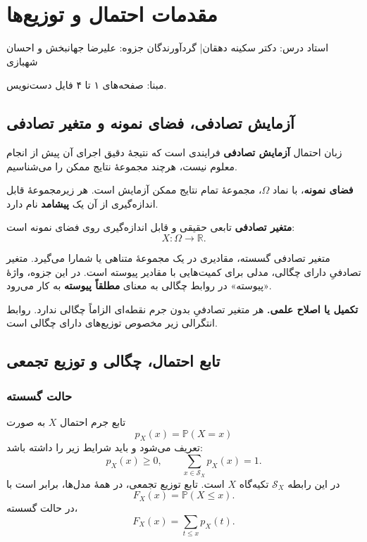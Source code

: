 \documentclass[12pt,a4paper,oneside]{report}
\newcounter{ex}[chapter]
\newcommand{\edit}[1]{\par\begingroup\small\color{alert}\textbf{تکمیل یا اصلاح علمی.} #1\par\endgroup}
\newcommand{\source}[1]{\par{\small\color{muted} مبنا: صفحه‌های #1 فایل دست‌نویس.}\par}
\newcommand{\R}{\mathbb R}
\newcommand{\Prob}{\mathbb P}
\begin{document}
\setcounter{chapter}{0}
\chapter{مقدمات احتمال و توزیع‌ها}
\begin{center}{\small\color{muted} استاد درس: دکتر سکینه دهقان\quad | \quad گردآورندگان جزوه: علیرضا جهانبخش و احسان شهبازی}\end{center}

\source{۱ تا ۴}
\section{آزمایش تصادفی، فضای نمونه و متغیر تصادفی}
\begin{definition}{زبان احتمال}
\textbf{آزمایش تصادفی} فرایندی است که نتیجهٔ دقیق اجرای آن پیش از انجام معلوم نیست، هرچند مجموعهٔ نتایج ممکن را می‌شناسیم.

\textbf{فضای نمونه}، با نماد $\Omega$، مجموعهٔ تمام نتایج ممکن آزمایش است. هر زیرمجموعهٔ قابل اندازه‌گیری از آن یک \textbf{پیشامد} نام دارد.

\textbf{متغیر تصادفی} تابعی حقیقی و قابل اندازه‌گیری روی فضای نمونه است:
\[X:\Omega\longrightarrow\R.\]
\end{definition}
متغیر تصادفی گسسته، مقادیری در یک مجموعهٔ متناهی یا شمارا می‌گیرد. متغیر تصادفیِ دارای چگالی، مدلی برای کمیت‌هایی با مقادیر پیوسته است. در این جزوه، واژهٔ «پیوسته» در روابط چگالی به معنای \textbf{مطلقاً پیوسته} به کار می‌رود.
\edit{هر متغیر تصادفیِ بدون جرم نقطه‌ای الزاماً چگالی ندارد. روابط انتگرالی زیر مخصوص توزیع‌های دارای چگالی است.}
\section{تابع احتمال، چگالی و توزیع تجمعی}
\subsection{حالت گسسته}
تابع جرم احتمال $X$ به صورت
\[p_X(x)=\Prob(X=x)\]
تعریف می‌شود و باید شرایط زیر را داشته باشد:
\[p_X(x)\ge0,\qquad\sum_{x\in\mathcal S_X}p_X(x)=1.\]
در این رابطه $\mathcal S_X$ تکیه‌گاه $X$ است. تابع توزیع تجمعی، در همهٔ مدل‌ها، برابر است با
\[F_X(x)=\Prob(X\le x).\]
در حالت گسسته،
\[F_X(x)=\sum_{t\le x}p_X(t).\]
\end{document}
